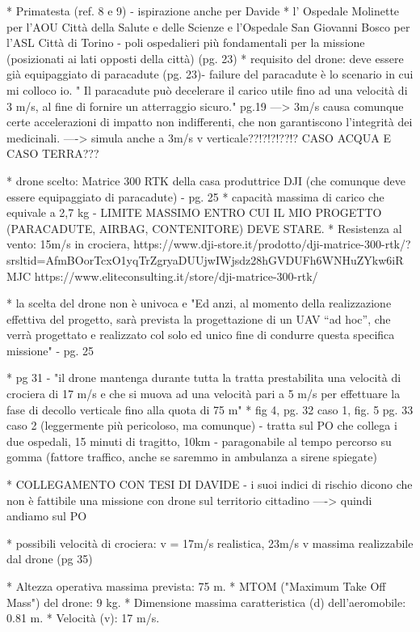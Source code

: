 * Primatesta (ref. 8 e 9) - ispirazione anche per Davide
* l’ Ospedale Molinette per l’AOU Città della Salute e delle Scienze e l’Ospedale San Giovanni Bosco per l’ASL Città di Torino - poli ospedalieri più fondamentali per la missione (posizionati ai lati opposti della città) (pg. 23) 
* requisito del drone: deve essere già equipaggiato di paracadute (pg. 23)- failure del paracadute è lo scenario in cui mi colloco io.
" Il paracadute può decelerare il carico utile fino ad una velocità di 3 m/s, al fine di fornire 
un atterraggio sicuro." pg.19 ---> 3m/s causa comunque certe accelerazioni di impatto non indifferenti, che non garantiscono l'integrità dei medicinali.
----> simula anche a 3m/s v verticale??!?!?!??!? CASO ACQUA E CASO TERRA???

* drone scelto: Matrice 300 RTK della casa produttrice DJI (che comunque deve essere equipaggiato di paracadute) - pg. 25
    * capacità massima di carico che equivale a 2,7 kg - LIMITE MASSIMO ENTRO CUI IL MIO PROGETTO (PARACADUTE, AIRBAG, CONTENITORE) DEVE STARE.
    * Resistenza al vento: 15m/s in crociera,
    https://www.dji-store.it/prodotto/dji-matrice-300-rtk/?srsltid=AfmBOorTcxO1yqTrZgryaDUUjwIWjsdz28hGVDUFh6WNHuZYkw6iRMJC
    https://www.eliteconsulting.it/store/dji-matrice-300-rtk/


* la scelta del drone non è univoca e "Ed anzi, al momento della realizzazione effettiva del 
progetto, sarà prevista la progettazione di un UAV “ad hoc”, che verrà progettato e 
realizzato col solo ed unico fine di condurre questa specifica missione" - pg. 25

* pg 31 - "il drone mantenga durante tutta la tratta prestabilita una velocità di crociera 
di 17 m/s e che si muova ad una velocità pari a 5 m/s per effettuare la fase di decollo 
verticale fino alla quota di 75 m"
* fig 4, pg. 32 caso 1, fig. 5 pg. 33 caso 2 (leggermente più pericoloso, ma comunque) - tratta sul PO che collega i due ospedali, 15 minuti di tragitto, 10km - paragonabile al tempo percorso su gomma (fattore traffico, anche se saremmo in ambulanza a sirene spiegate)

* COLLEGAMENTO CON TESI DI DAVIDE - i suoi indici di rischio dicono che non è fattibile una missione con drone sul territorio cittadino ----> quindi andiamo sul PO

* possibili velocità di crociera: v = 17m/s realistica, 23m/s v massima realizzabile dal drone (pg 35)


* Altezza operativa massima prevista: 75 m. 
* MTOM ("Maximum Take Off Mass") del drone: 9 kg. 
* Dimensione massima caratteristica (d) dell'aeromobile: 0.81 m. 
* Velocità (v): 17 m/s. 


